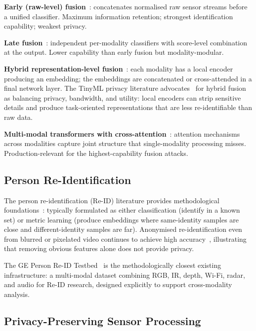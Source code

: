 \documentclass[sigconf,nonacm]{acmart}
\begin{document}
\textbf{Early (raw-level) fusion}~\cite{george2025tinyml}:
concatenates normalised raw sensor streams before a unified
classifier. Maximum information retention; strongest
identification capability; weakest privacy.

\textbf{Late fusion}~\cite{george2025tinyml}: independent
per-modality classifiers with score-level combination at the
output. Lower capability than early fusion but
modality-modular.

\textbf{Hybrid representation-level fusion}~\cite{george2025tinyml}:
each modality has a local encoder producing an embedding; the
embeddings are concatenated or cross-attended in a final
network layer. The TinyML privacy literature
advocates~\cite{george2025tinyml} for hybrid fusion as
balancing privacy, bandwidth, and utility: local encoders can
strip sensitive details and produce task-oriented representations
that are less re-identifiable than raw data.

\textbf{Multi-modal transformers with cross-attention}~\cite{
hori2024merl,tsai2019multimodal}: attention mechanisms across
modalities capture joint structure that single-modality
processing misses. Production-relevant for the highest-capability
fusion attacks.

\subsection{Person Re-Identification}

The person re-identification (Re-ID) literature provides
methodological foundations~\cite{ye2024reidsurv,
zhao2021reidtest}: typically formulated as either
classification (identify in a known set) or metric learning
(produce embeddings where same-identity samples are close and
different-identity samples are far). Anonymised re-identification
even from blurred or pixelated video continues to achieve high
accuracy~\cite{anonymized2024reid}, illustrating that removing
obvious features alone does not provide privacy.

The GE Person Re-ID Testbed~\cite{zhao2021reidtest} is the
methodologically closest existing infrastructure: a multi-modal
dataset combining RGB, IR, depth, Wi-Fi, radar, and audio for
Re-ID research, designed explicitly to support cross-modality
analysis.

\subsection{Privacy-Preserving Sensor Processing}
\end{document}
